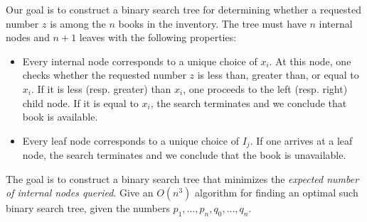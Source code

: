 \documentclass[11pt]{article}
\begin{document}
\begin{enumerate}
Our goal is to construct a binary search tree for determining whether a requested number $z$ is among the $n$ books in the inventory. The tree must have $n$ internal nodes and $n + 1$ leaves with the following properties:
\begin{itemize}
    \item Every internal node corresponds to a unique choice of $x_i$. At this node, one checks whether the requested number $z$ is less than, greater than, or equal to $x_i$. If it is less (resp. greater) than $x_i$, one proceeds to the left (resp. right) child node. If it is equal to $x_i$, the search terminates and we conclude that book is available.
    \item Every leaf node corresponds to a unique choice of $I_j$. If one arrives at a leaf node, the search terminates and we conclude that the book is unavailable.
\end{itemize}
The goal is to construct a binary search tree that minimizes the \emph{expected number of internal nodes queried}. Give an $O(n^3)$ algorithm for finding an optimal such binary search tree, given the numbers $p_1,\ldots,p_n,q_0,\ldots,q_n$.


\end{enumerate}
\end{document}
